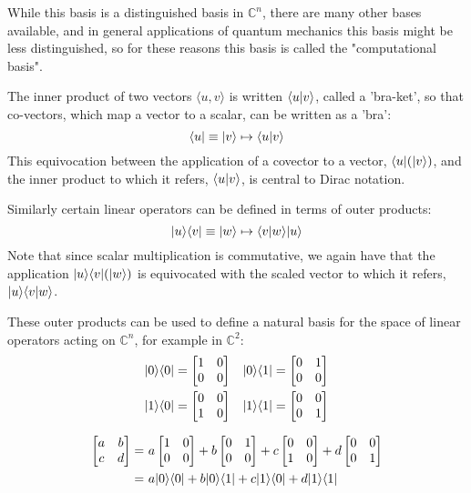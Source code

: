 While this basis is a distinguished basis in $\mathbb{C}^n$, there are many other bases available, and in general applications of quantum mechanics this basis might be less distinguished, so for these reasons this basis is called the "computational basis".

The inner product of two vectors $\langle u, v\rangle$ is written $\langle u | v \rangle$, called a 'bra-ket', so that co-vectors, which map a vector to a scalar, can be written as a 'bra':
\[\langle u | \equiv | v \rangle \mapsto \langle u | v \rangle\]
This equivocation between the application of a covector to a vector, $\langle u |(| v \rangle)$, and the inner product to which it refers, $\langle u | v \rangle$, is central to Dirac notation.

Similarly certain linear operators can be defined in terms of outer products:
\[| u \rangle\langle v | \equiv | w \rangle \mapsto \langle v | w \rangle| u \rangle\]
Note that since scalar multiplication is commutative, we again have that the application $| u \rangle\langle v |(| w \rangle)$ is equivocated with the scaled vector to which it refers, $| u \rangle\langle v | w \rangle$.

These outer products can be used to define a natural basis for the space of linear operators acting on $\mathbb{C}^n$, for example in $\mathbb{C}^2$:
\begin{align*}
| 0 \rangle\langle 0 | = \left[\begin{matrix}
1&0\\
0&0
\end{matrix}\right]
&&&
| 0 \rangle\langle 1 | = \left[\begin{matrix}
0&1\\
0&0
\end{matrix}\right]
\\
| 1 \rangle\langle 0 | = \left[\begin{matrix}
0&0\\
1&0
\end{matrix}\right]
&&&
| 1 \rangle\langle 1 | = \left[\begin{matrix}
0&0\\
0&1
\end{matrix}\right]
\end{align*}

\begin{align*}
\left[\begin{matrix}
a&b\\
c&d
\end{matrix}\right]
=&\ 
a\left[\begin{matrix}
1&0\\
0&0
\end{matrix}\right]
+
b\left[\begin{matrix}
0&1\\
0&0
\end{matrix}\right]
+
c\left[\begin{matrix}
0&0\\
1&0
\end{matrix}\right]
+
d\left[\begin{matrix}
0&0\\
0&1
\end{matrix}\right]
\\=&\  a\ket{0}\bra{0}+b\ket{0}\bra{1}+c\ket{1}\bra{0}+d\ket{1}\bra{1}
\end{align*}
